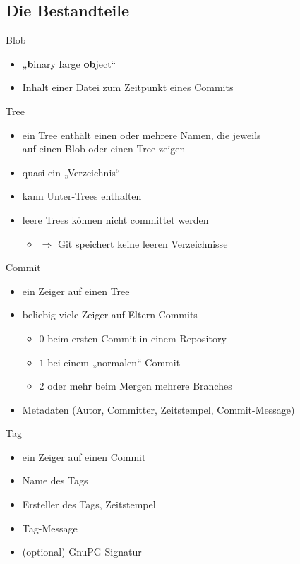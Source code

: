\subsection{Die Bestandteile}

\begin{frame}{Blob}
\begin{itemize}
	\item „\textbf{b}inary \textbf{l}arge \textbf{ob}ject“
	\item Inhalt einer Datei zum Zeitpunkt eines Commits\HW
\end{itemize}
\end{frame}

\begin{frame}{Tree}
\begin{itemize}
	\item ein Tree enthält einen oder mehrere Namen, die jeweils\\auf einen Blob oder einen Tree zeigen
	\item quasi ein „Verzeichnis“
	\item kann Unter-Trees enthalten
	\item leere Trees können nicht committet werden\HW
	\begin{itemize}
		\item $\Rightarrow$ Git speichert keine leeren Verzeichnisse
	\end{itemize}
\end{itemize}
\end{frame}

\begin{frame}{Commit}
\begin{itemize}
	\item ein Zeiger auf einen Tree
	\item beliebig viele Zeiger auf Eltern-Commits
	\begin{itemize}
		\item $0$ beim ersten Commit in einem Repository
		\item $1$ bei einem „normalen“ Commit
		\item $2$ oder mehr beim Mergen mehrere Branches
	\end{itemize}
	\item Metadaten (Autor, Committer, Zeitstempel, Commit-Message)
\end{itemize}
\end{frame}

\begin{frame}{Tag}
\begin{itemize}
	\item ein Zeiger auf einen Commit
	\item Name des Tags
	\item Ersteller des Tags, Zeitstempel
	\item Tag-Message
	\item (optional) GnuPG-Signatur
\end{itemize}
\end{frame}

